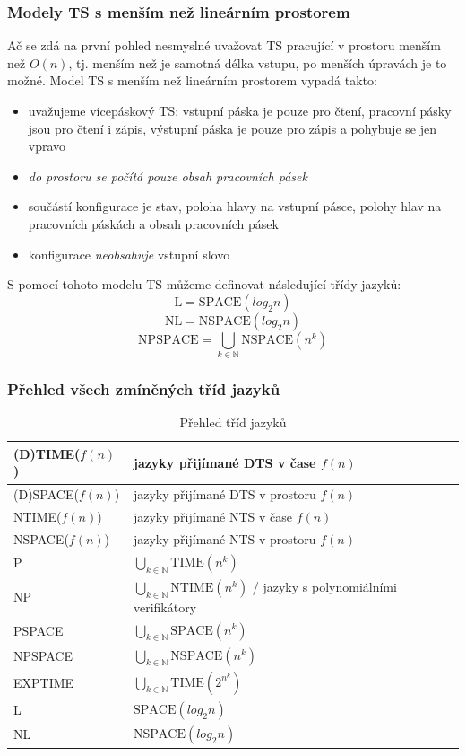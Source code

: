 \documentclass[11pt]{report} %
\newcommand{\N}{\mathbb{N}}
\numberwithin{equation}{section}
\begin{document}
\subsubsection{Modely TS s menším než lineárním prostorem}
Ač se zdá na první pohled nesmyslné uvažovat TS pracující v prostoru menším než $O(n)$, tj. menším než je samotná délka vstupu, po menších úpravách je to možné. Model TS s menším než lineárním prostorem vypadá takto: 
\begin{itemize}
	
	
	\item uvažujeme vícepáskový TS: vstupní páska je pouze pro čtení, pracovní pásky jsou pro čtení i zápis, výstupní páska je pouze pro zápis a pohybuje se jen vpravo
	\item \textit{do prostoru se počítá pouze obsah pracovních pásek}
	\item součástí konfigurace je stav, poloha hlavy na vstupní pásce, polohy hlav na pracovních páskách a obsah pracovních pásek
	\item konfigurace \textit{neobsahuje} vstupní slovo
\end{itemize}

S pomocí tohoto modelu TS můžeme definovat následující třídy jazyků:
$$\text{L} = \text{SPACE}(log_2n)$$
$$\text{NL} = \text{NSPACE}(log_2n)$$
$$\text{NPSPACE} = \bigcup_{k\in\N}\text{NSPACE}(n^k)$$

\subsubsection{Přehled všech zmíněných tříd jazyků}
\begin{table}[H]
	\centering
	\renewcommand{\arraystretch}{1.5}
	\begin{tabular}{|l|l|}
		\hline
		(D)TIME($f(n)$) & jazyky přijímané DTS v čase $f(n)$\\ \hline
		(D)SPACE($f(n)$) & jazyky přijímané DTS v prostoru $f(n)$\\ \hline
		NTIME($f(n)$) & jazyky přijímané NTS v čase $f(n)$\\ \hline
		NSPACE($f(n)$) & jazyky přijímané NTS v prostoru $f(n)$\\ \hline
		P & $\bigcup_{k\in\N} \text{TIME}(n^k)$ \\ \hline
		NP & $\bigcup_{k\in\N}\text{NTIME}(n^k)$ / jazyky s polynomiálními verifikátory \\ \hline
		PSPACE & $\bigcup_{k\in\N} \text{SPACE}(n^k)$ \\ \hline
		NPSPACE & $\bigcup_{k\in\N}\text{NSPACE}(n^k)$ \\ \hline
		EXPTIME & $\bigcup_{k\in\N} \text{TIME}(2^{n^k})$ \\ \hline
		L & $\text{SPACE}(log_2n)$ \\ \hline
		NL & $\text{NSPACE}(log_2n)$ \\ \hline
	\end{tabular}
	\caption{Přehled tříd jazyků}
	\label{complexity_languages}
\end{table}
\end{document}
